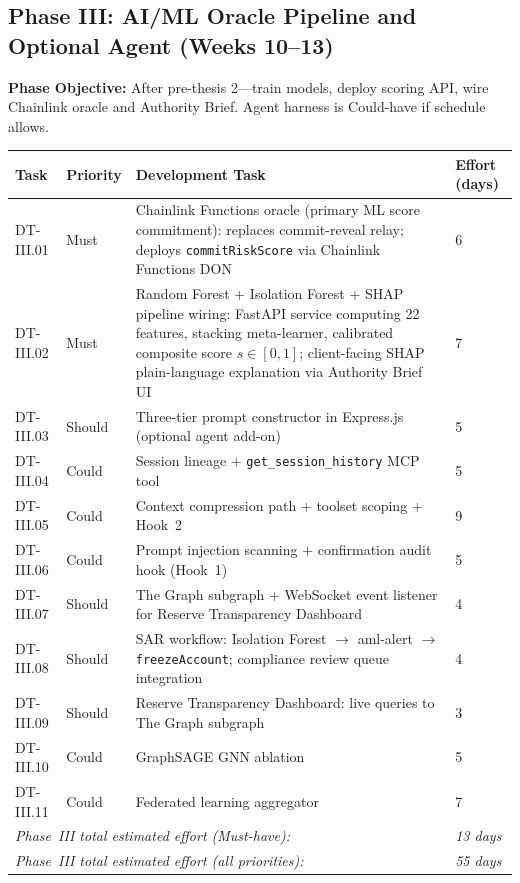 \documentclass[12pt, a4paper]{report}
\newcommand{\tableheadcolor}{\rowcolor{TableHeadBg}}
\begin{document}
\vspace{2pt}

\subsection{Phase III: AI/ML Oracle Pipeline and Optional Agent (Weeks 10--13)}

\textbf{Phase Objective:} After pre-thesis 2---train models, deploy scoring API, wire Chainlink oracle and Authority Brief. Agent harness is Could-have if schedule allows.

\begin{table}[H]
\centering
\begin{tabular}{p{1.8cm}p{1.8cm}p{7.5cm}p{1.5cm}}
\toprule
\tableheadcolor
\textbf{Task} & \textbf{Priority} & \textbf{Development Task} & \textbf{Effort (days)} \\
\midrule
DT-III.01 & Must & Chainlink Functions oracle (primary ML score commitment): replaces commit-reveal relay; deploys \texttt{commitRiskScore} via Chainlink Functions DON & 6 \\
DT-III.02 & Must & Random Forest + Isolation Forest + SHAP pipeline wiring: FastAPI service computing 22 features, stacking meta-learner, calibrated composite score $s \in [0, 1]$; client-facing SHAP plain-language explanation via Authority Brief UI & 7 \\
DT-III.03 & Should & Three-tier prompt constructor in Express.js (optional agent add-on) & 5 \\
DT-III.04 & Could & Session lineage + \texttt{get\_session\_history} MCP tool & 5 \\
DT-III.05 & Could & Context compression path + toolset scoping + Hook~2 & 9 \\
DT-III.06 & Could & Prompt injection scanning + confirmation audit hook (Hook~1) & 5 \\
DT-III.07 & Should & The Graph subgraph + WebSocket event listener for Reserve Transparency Dashboard & 4 \\
DT-III.08 & Should & SAR workflow: Isolation Forest $\to$ aml-alert $\to$ \texttt{freezeAccount}; compliance review queue integration & 4 \\
DT-III.09 & Should & Reserve Transparency Dashboard: live queries to The Graph subgraph & 3 \\
DT-III.10 & Could & GraphSAGE GNN ablation & 5 \\
DT-III.11 & Could & Federated learning aggregator & 7 \\
\multicolumn{3}{l}{\textit{Phase~III total estimated effort (Must-have):}} & \textit{13 days} \\
\multicolumn{3}{l}{\textit{Phase~III total estimated effort (all priorities):}} & \textit{55 days} \\
\bottomrule
\end{tabular}
\end{table}
\end{document}
